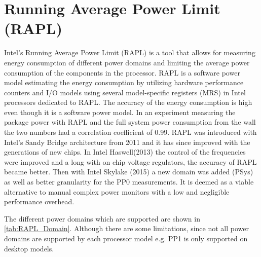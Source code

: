 \section{Running Average Power Limit (RAPL)}
Intel's Running Average Power Limit (RAPL) is a tool that allows for measuring energy consumption of different power domains and limiting the average power consumption of the components in the processor. RAPL is a software power model estimating the energy consumption by utilizing hardware performance counters and I/O models using several model-specific registers (MRS) in Intel processors dedicated to RAPL.\cite{Power-Management_Sandy_Bridge,Zhang2021} The accuracy of the energy consumption is  high even though it is a software power model\cite{RAPL_ACU1,RAPL_ACU2}. In an experiment measuring the package power with RAPL and the full system power consumption from the wall the two numbers had a correlation coefficient of 0.99.\cite{RAPL_in_action} RAPL was introduced with Intel's Sandy Bridge architecture from 2011 and it has since improved with the generations of new chips. In Intel Haswell(2013) the control of the frequencies were improved and a long with on chip voltage regulators, the accuracy of RAPL became better. Then with Intel Skylake (2015) a new domain was added (PSys) as well as better granularity for the PP0 measurements. It is deemed as   a viable alternative to manual complex power monitors with a low and negligible performance overhead. \cite{RAPL_in_action}

The different power domains which are supported are shown in \cref{tab:RAPL_Domain}. Although there are some limitations, since not all power domains are supported by each processor model e.g. PP1 is only supported on desktop models.

